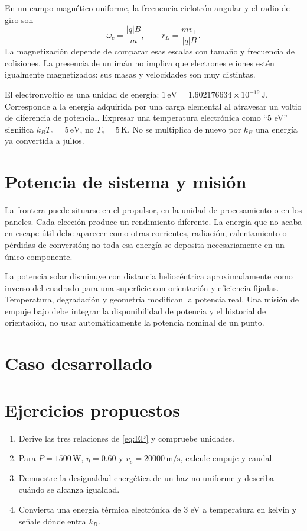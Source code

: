 En un campo magnético uniforme, la frecuencia ciclotrón angular y el radio de giro son
\[
 \omega_c=\frac{|q|B}{m},\qquad r_L=\frac{mv_\perp}{|q|B}.
\]
La magnetización depende de comparar esas escalas con tamaño y frecuencia de colisiones. La presencia de un imán no implica que electrones e iones estén igualmente magnetizados: sus masas y velocidades son muy distintas.

El electronvoltio es una unidad de energía: $1\,\mathrm{eV}=1.602176634\times10^{-19}\,\mathrm J$. Corresponde a la energía adquirida por una carga elemental al atravesar un voltio de diferencia de potencial. Expresar una temperatura electrónica como ``5 eV'' significa $k_BT_e=5\,\mathrm{eV}$, no $T_e=5\,\mathrm K$. No se multiplica de nuevo por $k_B$ una energía ya convertida a julios.
\section{Potencia de sistema y misión}
La frontera puede situarse en el propulsor, en la unidad de procesamiento o en los paneles. Cada elección produce un rendimiento diferente. La energía que no acaba en escape útil debe aparecer como otras corrientes, radiación, calentamiento o pérdidas de conversión; no toda esa energía se deposita necesariamente en un único componente.

La potencia solar disminuye con distancia heliocéntrica aproximadamente como inverso del cuadrado para una superficie con orientación y eficiencia fijadas. Temperatura, degradación y geometría modifican la potencia real. Una misión de empuje bajo debe integrar la disponibilidad de potencia y el historial de orientación, no usar automáticamente la potencia nominal de un punto.
\section{Caso desarrollado}

\section{Ejercicios propuestos}
\begin{enumerate}
\item Derive las tres relaciones de \eqref{eq:EP} y compruebe unidades.
\item Para $P=1500\,\mathrm W$, $\eta=0.60$ y $v_e=20000\,\mathrm{m/s}$, calcule empuje y caudal.
\item Demuestre la desigualdad energética de un haz no uniforme y describa cuándo se alcanza igualdad.
\item Convierta una energía térmica electrónica de 3 eV a temperatura en kelvin y señale dónde entra $k_B$.
\end{enumerate}


\studiumchaptercheck
